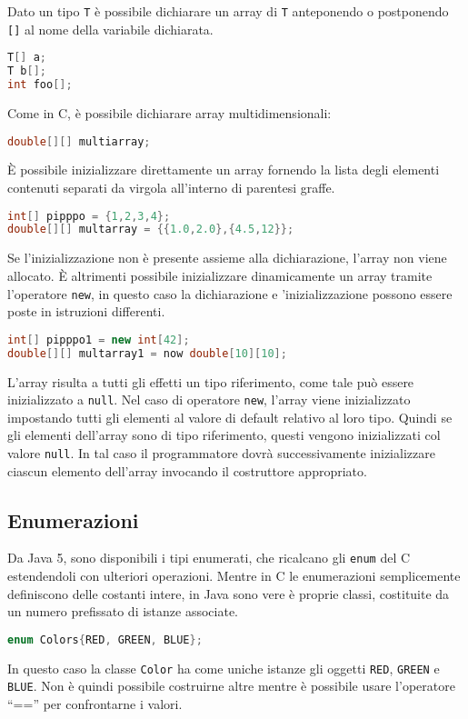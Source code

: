 \documentclass{article}
\begin{document}
Dato un tipo \texttt{T} è possibile dichiarare un array di \texttt{T}
anteponendo o postponendo \texttt{[]} al nome della variabile
dichiarata.
\begin{lstlisting}[language=Java,escapechar=|]
T[] a;
T b[];
int foo[];
\end{lstlisting}
Come in C, è possibile dichiarare array multidimensionali:
\begin{lstlisting}[language=Java,escapechar=|]
double[][] multiarray;
\end{lstlisting}
È possibile inizializzare direttamente un array fornendo
la lista degli elementi contenuti separati da virgola
all'interno di parentesi graffe.
\begin{lstlisting}[language=Java,escapechar=|]
int[] pipppo = {1,2,3,4};
double[][] multarray = {{1.0,2.0},{4.5,12}};
\end{lstlisting} 
Se l'inizializzazione non è presente assieme alla dichiarazione,
l'array non viene allocato.
È altrimenti possibile inizializzare dinamicamente un array tramite 
l'operatore \texttt{new},
in questo caso la dichiarazione e 'inizializzazione possono essere
poste in istruzioni differenti.
\begin{lstlisting}[language=Java,escapechar=|]
int[] pipppo1 = new int[42];
double[][] multarray1 = now double[10][10];
\end{lstlisting} 
L'array risulta a tutti gli effetti un tipo riferimento, come
tale può essere inizializzato a \texttt{null}.
Nel caso di operatore \texttt{new}, l'array viene inizializzato 
impostando tutti gli elementi al valore di default relativo al
loro tipo.
Quindi se gli elementi dell'array sono di tipo riferimento, 
questi vengono inizializzati col valore \texttt{null}.
In tal caso il programmatore dovrà successivamente
inizializzare ciascun elemento dell'array invocando 
il costruttore appropriato.

\subsection{Enumerazioni}

Da Java 5, sono disponibili i tipi enumerati, che
ricalcano gli \texttt{enum} del C estendendoli con
ulteriori operazioni.
Mentre in C le enumerazioni semplicemente definiscono delle
costanti intere, in Java sono vere è proprie classi,
costituite da un numero prefissato di istanze associate.
\begin{lstlisting}[language=Java,escapechar=|]
enum Colors{RED, GREEN, BLUE};
\end{lstlisting}  
In questo caso la classe \texttt{Color}
ha come uniche istanze gli oggetti \texttt{RED},
\texttt{GREEN} e \texttt{BLUE}.
Non è quindi possibile costruirne altre mentre è possibile
usare l'operatore ``=='' per confrontarne i valori.
\end{document}
